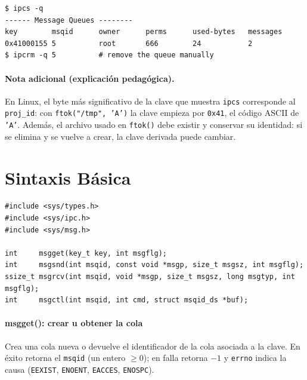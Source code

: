\documentclass[12pt,a4paper]{article}
\begin{document}
\begin{lstlisting}[language={}, numbers=none]
$ ipcs -q
------ Message Queues --------
key        msqid      owner      perms      used-bytes   messages
0x41000155 5          root       666        24           2
$ ipcrm -q 5          # remove the queue manually
\end{lstlisting}

\paragraph{Nota adicional (explicación pedagógica).} En Linux, el byte más significativo de la clave que muestra \texttt{ipcs} corresponde al \texttt{proj\_id}: con \texttt{ftok("/tmp", 'A')} la clave empieza por \texttt{0x41}, el código ASCII de \texttt{'A'}. Además, el archivo usado en \texttt{ftok()} debe existir y conservar su identidad: si se elimina y se vuelve a crear, la clave derivada puede cambiar.

\newpage

\section{Sintaxis Básica}
\begin{lstlisting}[numbers=none]
#include <sys/types.h>
#include <sys/ipc.h>
#include <sys/msg.h>

int     msgget(key_t key, int msgflg);
int     msgsnd(int msqid, const void *msgp, size_t msgsz, int msgflg);
ssize_t msgrcv(int msqid, void *msgp, size_t msgsz, long msgtyp, int msgflg);
int     msgctl(int msqid, int cmd, struct msqid_ds *buf);
\end{lstlisting}

\paragraph{msgget(): crear u obtener la cola}
Crea una cola nueva o devuelve el identificador de la cola asociada a la clave. En éxito retorna el \texttt{msqid} (un entero $\geq 0$); en falla retorna $-1$ y \texttt{errno} indica la causa (\texttt{EEXIST}, \texttt{ENOENT}, \texttt{EACCES}, \texttt{ENOSPC}).
\end{document}
